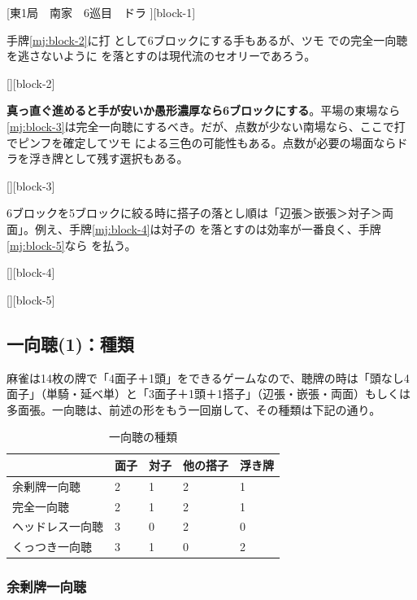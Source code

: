 \documentclass[10pt, twocolumn]{article}
\begin{document}
[東1局　南家　6巡目　ドラ ][block-1]

手牌\ref{mj:block-2}に打  として6ブロックにする手もあるが、ツモ  での完全一向聴を逃さないように  を落とすのは現代流のセオリーであろう\citep[][p. 21]{ishibashi-black}。

[][block-2]

\textbf{真っ直ぐ進めると手が安いか愚形濃厚なら6ブロックにする}\citep[][p. 23]{uzaku-haikouritsu}。平場の東場なら\ref{mj:block-3}は完全一向聴にするべき。だが、点数が少ない南場なら、ここで打  でピンフを確定してツモ  による三色の可能性もある。点数が必要の場面ならドラを浮き牌として残す選択もある。

[][block-3]

6ブロックを5ブロックに絞る時に搭子の落とし順は「辺張＞嵌張＞対子＞両面」。例え、手牌\ref{mj:block-4}は対子の  を落とすのは効率が一番良く、手牌\ref{mj:block-5}なら  を払う\citep[][pp. 21--22]{ishibashi-black}。

[][block-4]

[][block-5]


\subsection{一向聴(1)：種類}

麻雀は14枚の牌で「4面子＋1頭」をできるゲームなので、聴牌の時は「頭なし4面子」（単騎・延べ単）と「3面子＋1頭＋1搭子」（辺張・嵌張・両面）もしくは多面張。一向聴は、前述の形をもう一回崩して、その種類は下記の通り\citep{tomo-iishanten}。

\begin{table}[ht]
  \centering
  \begin{tabular}{lllll}
    & 面子 & 対子 & 他の搭子 & 浮き牌 \\
    \hline
    余剰牌一向聴 & 2 & 1 & 2 & 1 \\
    完全一向聴 & 2 & 1 & 2 & 1 \\
    ヘッドレス一向聴 & 3 & 0 & 2 & 0 \\
    くっつき一向聴 & 3 & 1 & 0 & 2
  \end{tabular}
  \caption{一向聴の種類}
\end{table}

\subsubsection*{余剰牌一向聴}
\end{document}
